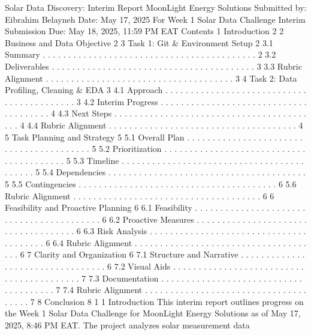 Solar Data Discovery: Interim Report
MoonLight Energy Solutions
Submitted by: Eibrahim Belayneh
Date: May 17, 2025
For Week 1 Solar Data Challenge
Interim Submission Due: May 18, 2025, 11:59 PM EAT
Contents
1 Introduction 2
2 Business and Data Objective 2
3 Task 1: Git & Environment Setup 2
3.1 Summary . . . . . . . . . . . . . . . . . . . . . . . . . . . . . . . . . . . . . . . . . . 2
3.2 Deliverables . . . . . . . . . . . . . . . . . . . . . . . . . . . . . . . . . . . . . . . . 3
3.3 Rubric Alignment . . . . . . . . . . . . . . . . . . . . . . . . . . . . . . . . . . . . . 3
4 Task 2: Data Profiling, Cleaning & EDA 3
4.1 Approach . . . . . . . . . . . . . . . . . . . . . . . . . . . . . . . . . . . . . . . . . . 3
4.2 Interim Progress . . . . . . . . . . . . . . . . . . . . . . . . . . . . . . . . . . . . . . 4
4.3 Next Steps . . . . . . . . . . . . . . . . . . . . . . . . . . . . . . . . . . . . . . . . . 4
4.4 Rubric Alignment . . . . . . . . . . . . . . . . . . . . . . . . . . . . . . . . . . . . . 4
5 Task Planning and Strategy 5
5.1 Overall Plan . . . . . . . . . . . . . . . . . . . . . . . . . . . . . . . . . . . . . . . . 5
5.2 Prioritization . . . . . . . . . . . . . . . . . . . . . . . . . . . . . . . . . . . . . . . . 5
5.3 Timeline . . . . . . . . . . . . . . . . . . . . . . . . . . . . . . . . . . . . . . . . . . 5
5.4 Dependencies . . . . . . . . . . . . . . . . . . . . . . . . . . . . . . . . . . . . . . . 5
5.5 Contingencies . . . . . . . . . . . . . . . . . . . . . . . . . . . . . . . . . . . . . . . 6
5.6 Rubric Alignment . . . . . . . . . . . . . . . . . . . . . . . . . . . . . . . . . . . . . 6
6 Feasibility and Proactive Planning 6
6.1 Feasibility . . . . . . . . . . . . . . . . . . . . . . . . . . . . . . . . . . . . . . . . . 6
6.2 Proactive Measures . . . . . . . . . . . . . . . . . . . . . . . . . . . . . . . . . . . . 6
6.3 Risk Analysis . . . . . . . . . . . . . . . . . . . . . . . . . . . . . . . . . . . . . . . 6
6.4 Rubric Alignment . . . . . . . . . . . . . . . . . . . . . . . . . . . . . . . . . . . . . 6
7 Clarity and Organization 6
7.1 Structure and Narrative . . . . . . . . . . . . . . . . . . . . . . . . . . . . . . . . . 6
7.2 Visual Aids . . . . . . . . . . . . . . . . . . . . . . . . . . . . . . . . . . . . . . . . . 7
7.3 Documentation . . . . . . . . . . . . . . . . . . . . . . . . . . . . . . . . . . . . . . 7
7.4 Rubric Alignment . . . . . . . . . . . . . . . . . . . . . . . . . . . . . . . . . . . . . 7
8 Conclusion 8
1
1 Introduction
This interim report outlines progress on the Week 1 Solar Data Challenge for MoonLight Energy Solutions as of May 17, 2025, 8:46 PM EAT. The project analyzes solar measurement data
